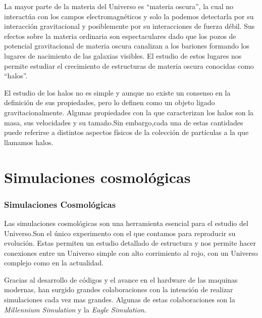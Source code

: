 \documentclass{beamer}
\begin{document}
	\begin{frame}
			La mayor parte de la materia del Universo es ``materia oscura'', la cual no interactúa con los campos electromagnéticos y solo la podemos detectarla por su interacción gravitacional y posiblemente por su interacciones de fuerza débil. Sus efectos sobre la materia ordinaria son espectaculares dado que los pozos de potencial gravitacional de materia oscura canalizan a los bariones formando los lugares de nacimiento de las galaxias visibles. El estudio de estos lugares nos permite estudiar el crecimiento de estructuras de materia oscura conocidas como ``halos''.

	\end{frame}


	\begin{frame}
		El estudio de los halos no es simple y aunque no existe un consenso en la definición de sus propiedades, pero lo definen como un objeto ligado gravitacionalmente. Algunas propiedades con la que caracterizan los halos son la masa, sus velocidades y su tamaño.Sin embargo,cada una de estas cantidades puede referirse a distintos aspectos físicos de la colección de partículas a la que llamamos halos.
	\end{frame}

\section{Simulaciones cosmológicas}
	\begin{frame}
		\frametitle{Simulaciones Cosmológicas}
		Las simulaciones cosmológicas son una herramienta esencial para el estudio del Universo.Son el único experimento con el que contamos para reproducir su evolución. Estas permiten un estudio detallado de estructura y nos permite hacer conexiones entre un Universo simple con alto corrimiento al rojo, con un Universo complejo como en la actualidad.
		
		Gracias al desarrollo de códigos y el avance en el hardware de las maquinas modernas, han surgido grandes colaboraciones con la intención de realizar simulaciones cada vez mas grandes. Algunas de estas colaboraciones son la \textit{Millennium Simulation} y la \textit{Eagle Simulation}.
	\end{frame}
\end{document}
